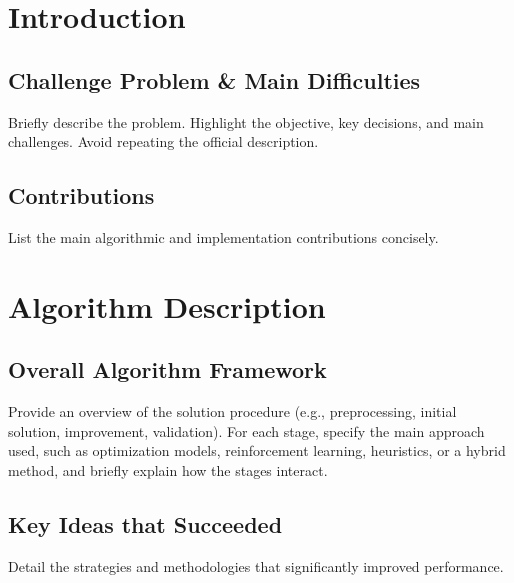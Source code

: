 \documentclass[runningheads]{llncs}
\begin{document}
\section{Introduction}


\subsection{Challenge Problem \& Main Difficulties}
\begin{guidance}
Briefly describe the problem. Highlight the objective, key decisions, and main challenges. Avoid repeating the  official description.
\end{guidance}


\subsection{Contributions}
\begin{guidance}
List the main algorithmic and implementation contributions concisely.
\end{guidance}


\section{Algorithm Description}


\subsection{Overall Algorithm Framework}
\begin{guidance}
Provide an overview of the solution procedure (e.g., preprocessing, initial solution, improvement, validation).
For each stage, specify the main approach used, such as optimization models, reinforcement learning, heuristics, or a hybrid method, and
briefly explain how the stages interact.
\end{guidance}


\subsection{Key Ideas that Succeeded}
\begin{guidance}
Detail the strategies and methodologies that significantly improved performance.
\end{guidance}
\end{document}
